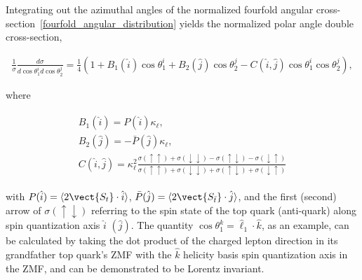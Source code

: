 Integrating out the azimuthal angles of the normalized fourfold angular cross-section~\ref{fourfold_angular_distribution} yields the normalized polar angle double cross-section,
\begin{linenomath*}
\begin{align}
\frac{1}{\sigma} \frac{d \sigma}{d \cos \theta_1^i d \cos \theta_2^j}=\frac{1}{4}\left(1+B_1(\hat{i}) \cos \theta_1^i+B_2(\hat{j}) \cos \theta_2^j-C(\hat{i},\hat{j}) \cos \theta_1^i \cos \theta_2^j\right),
\label{double_angular_distribution}
\end{align}
\end{linenomath*}
\begin{center}
where 
\end{center}
\begin{linenomath*}
\begin{align}
\begin{array}{c}
B_1(\hat{i}) = P(\hat{i})\kappa_\ell,\\
B_2(\hat{j}) = -\bar{P}(\hat{j})\kappa_\ell,\\
C(\hat{i}, \hat{j})=\kappa_{\ell}^2 \frac{\sigma(\uparrow \uparrow)+\sigma(\downarrow \downarrow)-\sigma(\uparrow \downarrow)-\sigma(\downarrow \uparrow)}{\sigma(\uparrow \uparrow)+\sigma(\downarrow \downarrow)+\sigma(\uparrow \downarrow)+\sigma(\downarrow \uparrow)}
\end{array}
\label{Polarizations_and_Spin_Correlations}
\end{align}
\end{linenomath*}
with $P(\hat{i}) = \langle 2 \vect{S_t} \cdot \hat{i} \rangle$, $\bar{P}(\hat{j}) = \langle 2 \vect{S_{\bar{t}}} \cdot \hat{j} \rangle$, and the first (second) arrow of $\sigma(\uparrow \downarrow)$ referring to the spin state of the top quark (anti-quark) along spin quantization axis $\hat{i}$ $(\hat{j})$.
The quantity $\cos \theta_1^k = \hat{\ell}_1 \cdot \hat{k}$, as an example, can be calculated by taking the dot product of the charged lepton direction in its grandfather top quark's ZMF with the $\hat{k}$ helicity basis spin quantization axis in the \ttbar ZMF, and can be demonstrated to be Lorentz invariant.

